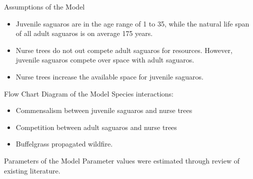 \documentclass{beamer}
\begin{document}
\begin{frame}{Assumptions of the Model}
\begin{itemize}
\item Juvenile saguaros are in the age range of 1 to 35, while the natural life span of all adult saguaros is on average 175 years.
\item<2-> Nurse trees do not out compete adult saguaros for resources. However, juvenile saguaros compete over space with adult saguaros.
\item<3-> Nurse trees increase the available space for juvenile saguaros.
\end{itemize}
\end{frame}

\begin{frame}{Flow Chart Diagram of the Model}
Species interactions:
\begin{itemize}
\item Commensalism between juvenile saguaros and nurse trees
\item Competition between adult saguaros and nurse trees
\item Buffelgrass propagated wildfire.
\end{itemize}

\end{frame}

\begin{frame}{Parameters of the Model}
Parameter values were estimated through review of existing literature.
\begin{center}

\end{center}
\end{frame}
\end{document}
